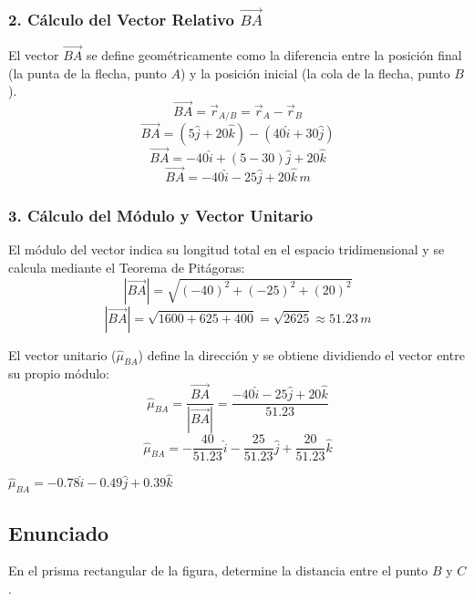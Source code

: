 \documentclass[12pt, a4paper]{article}
\begin{document}
\subsubsection*{2. Cálculo del Vector Relativo $\vec{BA}$}
El vector $\vec{BA}$ se define geométricamente como la diferencia entre la posición final (la punta de la flecha, punto $A$) y la posición inicial (la cola de la flecha, punto $B$).
$$\vec{BA} = \vec{r}_{A/B} = \vec{r}_A - \vec{r}_B$$
$$\vec{BA} = (5\hat{j} + 20\hat{k}) - (40\hat{i} + 30\hat{j})$$
$$\vec{BA} = -40\hat{i} + (5 - 30)\hat{j} + 20\hat{k}$$
$$\vec{BA} = -40\hat{i} - 25\hat{j} + 20\hat{k} \, \si{m}$$

\subsubsection*{3. Cálculo del Módulo y Vector Unitario}
El módulo del vector indica su longitud total en el espacio tridimensional y se calcula mediante el Teorema de Pitágoras:
$$|\vec{BA}| = \sqrt{(-40)^2 + (-25)^2 + (20)^2}$$
$$|\vec{BA}| = \sqrt{1600 + 625 + 400} = \sqrt{2625} \approx 51.23 \, \si{m}$$

El vector unitario ($\hat{\mu}_{BA}$) define la dirección y se obtiene dividiendo el vector entre su propio módulo:
$$\hat{\mu}_{BA} = \frac{\vec{BA}}{|\vec{BA}|} = \frac{-40\hat{i} - 25\hat{j} + 20\hat{k}}{51.23}$$
$$\hat{\mu}_{BA} = -\frac{40}{51.23}\hat{i} - \frac{25}{51.23}\hat{j} + \frac{20}{51.23}\hat{k}$$

\begin{tcolorbox}[colback=green!5!white, colframe=green!50!black, title=Respuesta Final]
\centering \Large $\hat{\mu}_{BA} = -0.78\hat{i} - 0.49\hat{j} + 0.39\hat{k}$
\end{tcolorbox}

\newpage

\subsection*{Enunciado}
En el prisma rectangular de la figura, determine la distancia entre el punto $B$ y $C$.
\end{document}
